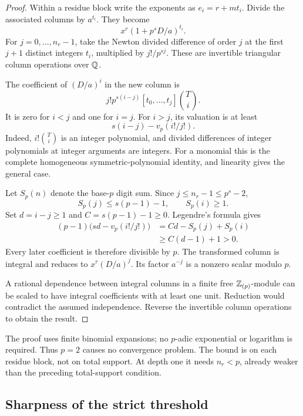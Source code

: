 \begin{proof}
Within a residue block write the exponents as $e_i=r+mt_i$. Divide the associated columns by $a^{t_i}$. They become
\[
                         x^r(1+p^sD/a)^{t_i}.
\]
For $j=0,\ldots,n_r-1$, take the Newton divided difference of order $j$ at the first $j+1$ distinct integers $t_i$, multiplied by $j!/p^{sj}$. These are invertible triangular column operations over $\mathbb Q$.

The coefficient of $(D/a)^i$ in the new column is
\[
 j!p^{s(i-j)}
       [t_0,\ldots,t_j]\binom{T}{i}.
\]
It is zero for $i<j$ and one for $i=j$. For $i>j$, its valuation is at least
\begin{equation}\label{eq:factorial-bound}
                       s(i-j)-v_p(i!/j!).
\end{equation}
Indeed, $i!\binom{T}{i}$ is an integer polynomial, and divided differences of integer polynomials at integer arguments are integers. For a monomial this is the complete homogeneous symmetric-polynomial identity, and linearity gives the general case.

Let $S_p(n)$ denote the base-$p$ digit sum. Since $j\le n_r-1\le p^s-2$,
\[
 S_p(j)\le s(p-1)-1,\qquad S_p(i)\ge1.
\]
Set $d=i-j\ge1$ and $C=s(p-1)-1\ge0$. Legendre's formula gives
\begin{align*}
 (p-1)\bigl(sd-v_p(i!/j!)\bigr)
 &=Cd-S_p(j)+S_p(i)\\
 &\ge C(d-1)+1>0.
\end{align*}
Every later coefficient is therefore divisible by $p$. The transformed column is integral and reduces to $x^r(D/a)^j$. Its factor $a^{-j}$ is a nonzero scalar modulo $p$.

A rational dependence between integral columns in a finite free $\mathbb Z_{(p)}$-module can be scaled to have integral coefficients with at least one unit. Reduction would contradict the assumed independence. Reverse the invertible column operations to obtain the result.
\end{proof}

The proof uses finite binomial expansions; no $p$-adic exponential or logarithm is required. Thus $p=2$ causes no convergence problem. The bound is on each residue block, not on total support. At depth one it needs $n_r<p$, already weaker than the preceding total-support condition.

\subsection{Sharpness of the strict threshold}

